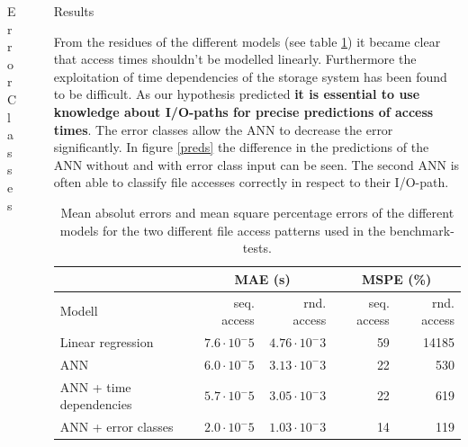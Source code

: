 \documentclass[final]{beamer}
\newlength{\sepwid}
\newlength{\onecolwid}
\begin{document}
\begin{frame}[t]
\begin{columns}[t]
\begin{column}{\onecolwid}
\begin{block}{Error Classes}

\end{block}

\end{column} %

\begin{column}{\sepwid}\end{column} %

\begin{column}{\onecolwid} %

\begin{block}{Results}
	
	From the residues of the different models (see table \ref{residues}) it became clear that access times shouldn't be modelled linearly.
	Furthermore the exploitation of time dependencies of the storage system has been found to be difficult.
	As our hypothesis predicted \textbf{it is essential to use knowledge about I/O-paths for precise predictions of access times}.
	The error classes allow the ANN to decrease the error significantly.
	In figure \ref{preds} the difference in the predictions of the ANN without and with error class input can be seen.
	The second ANN is often able to classify file accesses correctly in respect to their I/O-path.
	
	\begin{table}
		\scriptsize
		\vspace{0.1cm}
		\begin{tabular}{l|r|r|r|r}%
			&  \multicolumn{2}{|c}{MAE (s)}&  \multicolumn{2}{|c}{MSPE (\%)}\\ \hline
			Modell & seq. access & rnd. access & seq. access & rnd. access\\ \hline
			Linear regression & $7.6\cdot 10^-5$ & $4.76\cdot 10^-3$ & 59 & 14185  \\
			ANN & $6.0\cdot 10^-5$ & $3.13\cdot 10^-3$ & 22 & 530 \\
			ANN + time dependencies & $5.7\cdot 10^-5$ & $3.05\cdot 10^-3$ & 22 & 619\\
			ANN + error classes & $2.0\cdot 10^-5$ & $1.03\cdot 10^-3$ & 14 & 119\\
		\end{tabular}
		\caption{Mean absolut errors and mean square percentage errors of the different models for the two different file access patterns used in the benchmark-tests.}
		\label{residues}
	\end{table}
	

\end{block}
\end{column}
\end{columns}
\end{frame}
\end{document}
